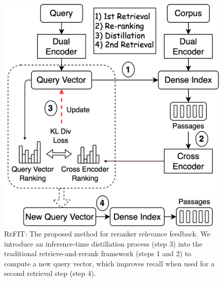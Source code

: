 \begin{figure}
    \centering
    \includegraphics[width=1.0\linewidth]{submissions/Revanth2024/figures/cross_encoder_feedback_2.png}
    \caption{\textsc{ReFIT}: The proposed method for reranker relevance feedback. We introduce an inference-time distillation process (step 3) into the traditional retrieve-and-rerank framework (steps 1 and 2) to compute a new query vector, which improves recall when used for a second retrieval step (step 4).}
    \label{fig:overall_framework}
    \vspace{-1em}
\end{figure}

